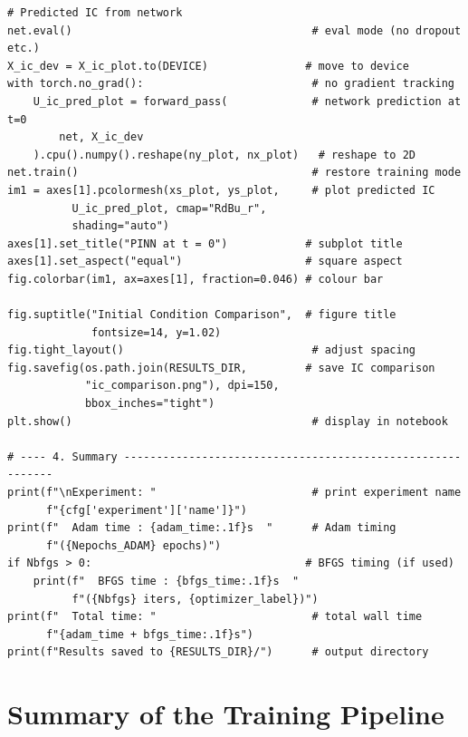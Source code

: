 \documentclass[11pt,a4paper]{article}
\begin{document}
\begin{lstlisting}
# Predicted IC from network
net.eval()                                     # eval mode (no dropout etc.)
X_ic_dev = X_ic_plot.to(DEVICE)               # move to device
with torch.no_grad():                          # no gradient tracking
    U_ic_pred_plot = forward_pass(             # network prediction at t=0
        net, X_ic_dev
    ).cpu().numpy().reshape(ny_plot, nx_plot)   # reshape to 2D
net.train()                                    # restore training mode
im1 = axes[1].pcolormesh(xs_plot, ys_plot,     # plot predicted IC
          U_ic_pred_plot, cmap="RdBu_r",
          shading="auto")
axes[1].set_title("PINN at t = 0")            # subplot title
axes[1].set_aspect("equal")                   # square aspect
fig.colorbar(im1, ax=axes[1], fraction=0.046) # colour bar

fig.suptitle("Initial Condition Comparison",  # figure title
             fontsize=14, y=1.02)
fig.tight_layout()                             # adjust spacing
fig.savefig(os.path.join(RESULTS_DIR,         # save IC comparison
            "ic_comparison.png"), dpi=150,
            bbox_inches="tight")
plt.show()                                     # display in notebook

# ---- 4. Summary -----------------------------------------------------------
print(f"\nExperiment: "                        # print experiment name
      f"{cfg['experiment']['name']}")
print(f"  Adam time : {adam_time:.1f}s  "      # Adam timing
      f"({Nepochs_ADAM} epochs)")
if Nbfgs > 0:                                 # BFGS timing (if used)
    print(f"  BFGS time : {bfgs_time:.1f}s  "
          f"({Nbfgs} iters, {optimizer_label})")
print(f"  Total time: "                        # total wall time
      f"{adam_time + bfgs_time:.1f}s")
print(f"Results saved to {RESULTS_DIR}/")      # output directory
\end{lstlisting}


\section{Summary of the Training Pipeline}
\label{sec:summary}
\end{document}

